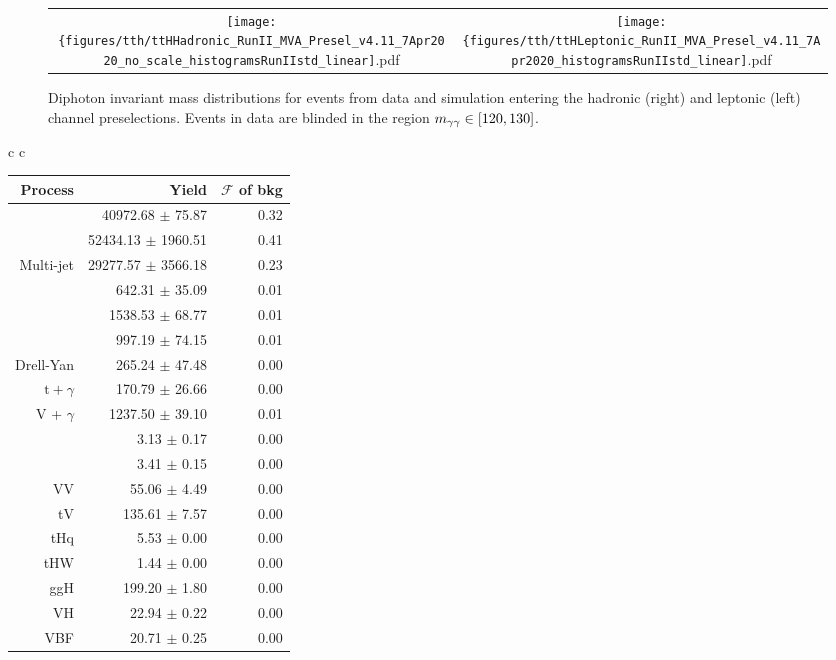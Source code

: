 \begin{figure} [h!]
    \centering
    \begin{tabular}{c c}
        \texttt{[image: \{figures/tth/ttHHadronic\_RunII\_MVA\_Presel\_v4.11\_7Apr2020\_no\_scale\_histogramsRunIIstd\_linear]}.pdf} &
        \texttt{[image: \{figures/tth/ttHLeptonic\_RunII\_MVA\_Presel\_v4.11\_7Apr2020\_histogramsRunIIstd\_linear]}.pdf} 
    \end{tabular}
    \caption{Diphoton invariant mass distributions for events from data and simulation entering the hadronic (right) and leptonic (left) channel preselections. Events in data are blinded in the region $m_{\gamma\gamma} \in [120, 130]$.}
    \label{fig:tth_mgg_presel_datamc}
\end{figure}

\begin{table} [h!]
    \centering
    \begin{tabular}{c c}
    	\begin{tabular}{ r || r | r} \hline \hline
			Process & Yield & $\mathcal F$ of bkg \\ \hline
			\dipho & 40972.68 $\pm$ 75.87 & 0.32 \\ 
			\gjets & 52434.13 $\pm$ 1960.51 & 0.41 \\ 
			Multi-jet & 29277.57 $\pm$ 3566.18 & 0.23 \\ 
			\ttgg & 642.31 $\pm$ 35.09 & 0.01 \\ 
			\ttg & 1538.53 $\pm$ 68.77 & 0.01 \\ 
			\ttb & 997.19 $\pm$ 74.15 & 0.01 \\ 
			Drell-Yan & 265.24 $\pm$ 47.48 & 0.00 \\ 
			$\text{t} + \gamma$ & 170.79 $\pm$ 26.66 & 0.00 \\ 
			V + $\gamma$ & 1237.50 $\pm$ 39.10 & 0.01 \\ 
			\ttW & 3.13 $\pm$ 0.17 & 0.00 \\ 
			\ttZ & 3.41 $\pm$ 0.15 & 0.00 \\ 
			VV & 55.06 $\pm$ 4.49 & 0.00 \\ 
			tV & 135.61 $\pm$ 7.57 & 0.00 \\  \hline
			tHq & 5.53 $\pm$ 0.00 & 0.00 \\
            tHW & 1.44 $\pm$ 0.00 & 0.00 \\
			ggH & 199.20 $\pm$ 1.80 & 0.00 \\
            VH & 22.94 $\pm$ 0.22 & 0.00 \\
            VBF & 20.71 $\pm$ 0.25 & 0.00 \\ \hline

\end{tabular}
\end{tabular}
\end{table}
